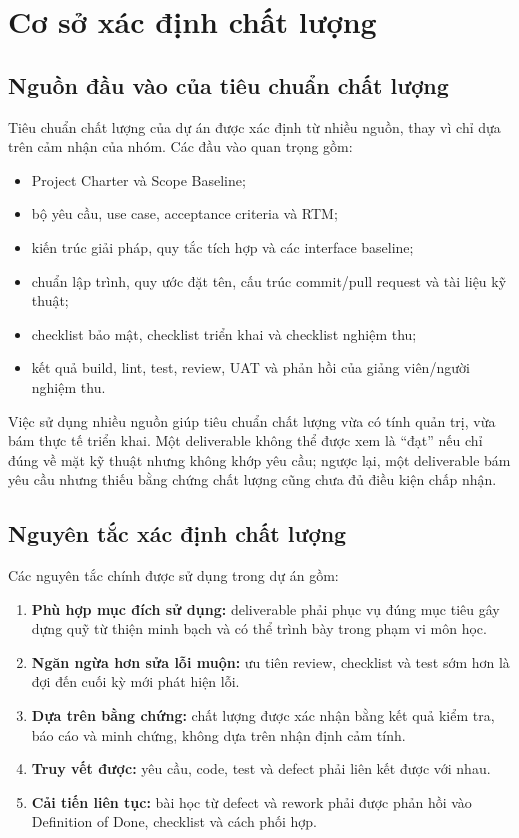 \section{Cơ sở xác định chất lượng}

\subsection{Nguồn đầu vào của tiêu chuẩn chất lượng}

Tiêu chuẩn chất lượng của dự án được xác định từ nhiều nguồn, thay vì chỉ dựa trên cảm nhận của nhóm. Các đầu vào quan trọng gồm:

\begin{itemize}
  \item Project Charter và Scope Baseline;
  \item bộ yêu cầu, use case, acceptance criteria và RTM;
  \item kiến trúc giải pháp, quy tắc tích hợp và các interface baseline;
  \item chuẩn lập trình, quy ước đặt tên, cấu trúc commit/pull request và tài liệu kỹ thuật;
  \item checklist bảo mật, checklist triển khai và checklist nghiệm thu;
  \item kết quả build, lint, test, review, UAT và phản hồi của giảng viên/người nghiệm thu.
\end{itemize}

Việc sử dụng nhiều nguồn giúp tiêu chuẩn chất lượng vừa có tính quản trị, vừa bám thực tế triển khai. Một deliverable không thể được xem là ``đạt'' nếu chỉ đúng về mặt kỹ thuật nhưng không khớp yêu cầu; ngược lại, một deliverable bám yêu cầu nhưng thiếu bằng chứng chất lượng cũng chưa đủ điều kiện chấp nhận.

\subsection{Nguyên tắc xác định chất lượng}

Các nguyên tắc chính được sử dụng trong dự án gồm:

\begin{enumerate}
  \item \textbf{Phù hợp mục đích sử dụng:} deliverable phải phục vụ đúng mục tiêu gây dựng quỹ từ thiện minh bạch và có thể trình bày trong phạm vi môn học.
  \item \textbf{Ngăn ngừa hơn sửa lỗi muộn:} ưu tiên review, checklist và test sớm hơn là đợi đến cuối kỳ mới phát hiện lỗi.
  \item \textbf{Dựa trên bằng chứng:} chất lượng được xác nhận bằng kết quả kiểm tra, báo cáo và minh chứng, không dựa trên nhận định cảm tính.
  \item \textbf{Truy vết được:} yêu cầu, code, test và defect phải liên kết được với nhau.
  \item \textbf{Cải tiến liên tục:} bài học từ defect và rework phải được phản hồi vào Definition of Done, checklist và cách phối hợp.
\end{enumerate}

